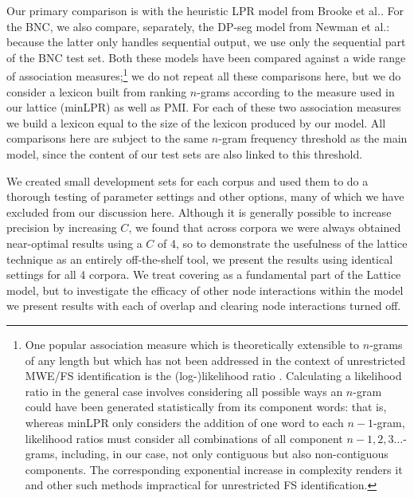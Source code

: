 \documentclass[11pt]{article}
\makeatletter
\def \al {al.\@ }
\makeatother
\begin{document}
Our primary comparison is with the heuristic LPR model from Brooke et \al {}. For the BNC, we also compare, separately, the DP-seg model from Newman et \al {}: because the latter only handles sequential output, we use only the sequential part of the BNC test set. Both these models have been compared against a wide range of association measures;\footnote{One popular association measure which is theoretically extensible to $n$-grams of any length but which has not been addressed in the context of unrestricted MWE/FS identification is the (log-)likelihood ratio \cite{Dunning93}. Calculating a likelihood ratio in the general case involves considering all possible ways an $n$-gram could have been generated statistically from its component words: that is, whereas minLPR only considers the addition of one word to each $n-1$-gram, likelihood ratios must consider all combinations of all component $n-1,2,3\ldots$-grams, including, in our case, not only contiguous but also non-contiguous components. The corresponding exponential increase in complexity renders it and other such methods impractical for unrestricted FS identification.} we do not repeat all these comparisons here, but we do consider a lexicon built from ranking $n$-grams according to the measure used in our lattice (minLPR) as well as PMI. For each of these two association measures we build a lexicon equal to the size of the lexicon produced by our model. All comparisons here are subject to the same $n$-gram frequency threshold as the main model, since the content of our test sets are also linked to this threshold.

We created small development sets for each corpus and used them to do a thorough testing of parameter settings and other options, many of which we have excluded from our discussion here. Although it is generally possible to increase precision by increasing $C$, we found that across corpora we were always obtained near-optimal results using a $C$ of 4, so to demonstrate the usefulness of the lattice technique as an entirely off-the-shelf tool, we present the results using identical settings for all 4 corpora. We treat covering as a fundamental part of the Lattice model, but to investigate the efficacy of other node interactions within the model we present results with each of overlap and clearing node interactions turned off.
\end{document}
